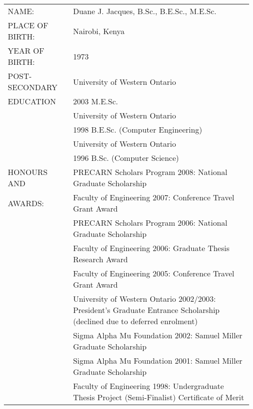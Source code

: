 
\begin{center}
\begin{tabular}{p{4.2cm}p{10.5cm}}
NAME:           &   Duane J. Jacques, B.Sc., B.E.Sc., M.E.Sc.\\[1.66ex]

PLACE OF BIRTH: &   Nairobi, Kenya\\[1.66ex]

YEAR OF BIRTH:  &   1973\\[1.66ex]

POST-SECONDARY  &   University of Western Ontario\\
EDUCATION       &   2003 M.E.Sc.\\[1.66ex]

            &   University of Western Ontario\\
            &   1998 B.E.Sc. (Computer Engineering)\\[1.66ex]

            &   University of Western Ontario\\
            &   1996 B.Sc. (Computer Science)\\[1.66ex]

HONOURS AND & PRECARN Scholars Program 2008: National Graduate Scholarship\\
AWARDS:     & Faculty of Engineering 2007: Conference Travel Grant Award\\
            & PRECARN Scholars Program 2006: National Graduate Scholarship\\
            & Faculty of Engineering 2006: Graduate Thesis Research Award\\
            & Faculty of Engineering 2005: Conference Travel Grant Award\\
            & University of Western Ontario 2002/2003: President's Graduate Entrance Scholarship (declined due to deferred enrolment)\\
            & Sigma Alpha Mu Foundation 2002: Samuel Miller Graduate Scholarship\\
            & Sigma Alpha Mu Foundation 2001: Samuel Miller Graduate Scholarship\\
            & Faculty of Engineering 1998: Undergraduate Thesis Project (Semi-Finalist) Certificate of Merit\\[1.66ex]
\end{tabular}
\end{center}
\newpage
